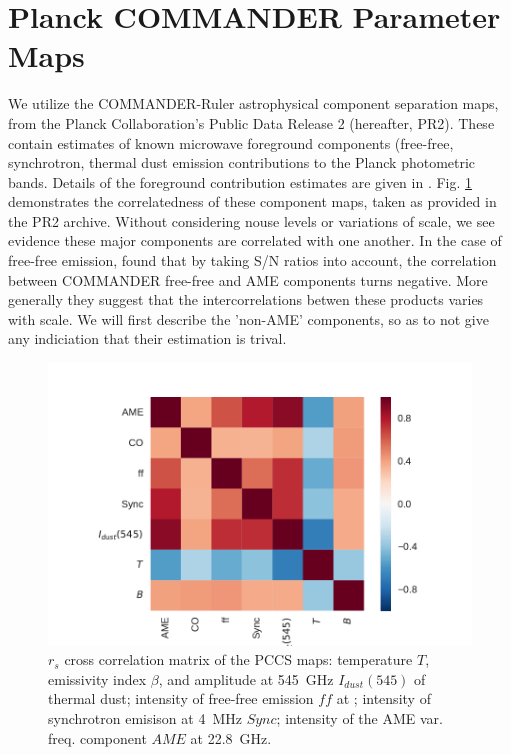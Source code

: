   \section{Planck COMMANDER Parameter Maps}

       We utilize the COMMANDER-Ruler astrophysical component separation maps, from the Planck Collaboration's Public Data Release 2 (hereafter, PR2). These contain estimates of known microwave foreground components (free-free, synchrotron, thermal dust emission contributions to the Planck photometric bands. Details of the foreground contribution estimates are given in \cite{planckXII}. Fig. \ref{fig:PCCS_corrmatrix} demonstrates the correlatedness of these component maps, taken as provided in the PR2 archive. Without considering nouse levels or variations of scale, we see evidence these major components are correlated with one another. In the case of free-free emission,  \cite{vonHausegger15} found that by taking S/N ratios into account, the correlation between COMMANDER free-free and AME components turns negative. More generally they suggest that the intercorrelations betwen these products varies with scale. We will first describe the 'non-AME' components, so as to not give any indiciation that their estimation is trival. 

       \begin{figure}
         \label{fig:PCCS_corrmatrix}
         \includegraphics[width=\textwidth]{../Plots/ch_datasources/PCCS_corrmatrix.pdf}
         \centering
         \caption{$r_{s}$ cross correlation matrix of the PCCS maps: temperature $T$, emissivity index $\beta$, and amplitude at 545~GHz $I_{dust}(545)$ of thermal dust; intensity of free-free emission $ff$ at ; intensity of synchrotron emisison at 4~MHz $Sync$; intensity of the AME var. freq. component $AME$ at 22.8~GHz.}
       \end{figure}

